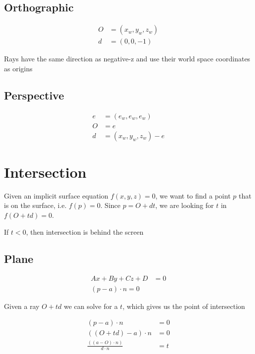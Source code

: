   \subsection{Orthographic}

    \begin{align}
      O &= \left( x_{w}, y_{w}, z_{w} \right) \\
      d &= \left( 0, 0, -1 \right)
    \end{align}

    Rays have the same direction as negative-z and use their world space
    coordinates as origins

  \subsection{Perspective}

    \begin{align}
      e &= \left( e_{w}, e_{w}, e_{w} \right) \\
      O &= e  \\
      d &= \left( x_{w}, y_{w}, z_{w} \right) - e
    \end{align}

\section{Intersection}

  Given an implicit surface equation $ f\left( x, y, z \right) = 0 $, we
  want to find a point $ p $ that is on the surface,
  i.e. $ f\left( p \right) = 0 $. Since $ p = O + dt $, we are looking for
  $ t $ in $ f\left( O + td \right) = 0 $.

  If $ t < 0 $, then intersection is behind the screen

  \subsection{Plane}

    \begin{align}
      Ax + By + Cz + D &= 0 \\
      \left( p - a \right) \cdot n = 0
    \end{align}

    Given a ray $ O + td $ we can solve for a $ t $, which gives us the
    point of intersection

    \begin{align*}
      \left( p - a \right) \cdot n &= 0 \\
      \left( \left( O + td \right) - a \right) \cdot n &= 0 \\
      \frac{\left( \left( a - O \right) \cdot n \right)}{d \cdot n} &= t
    \end{align*}

